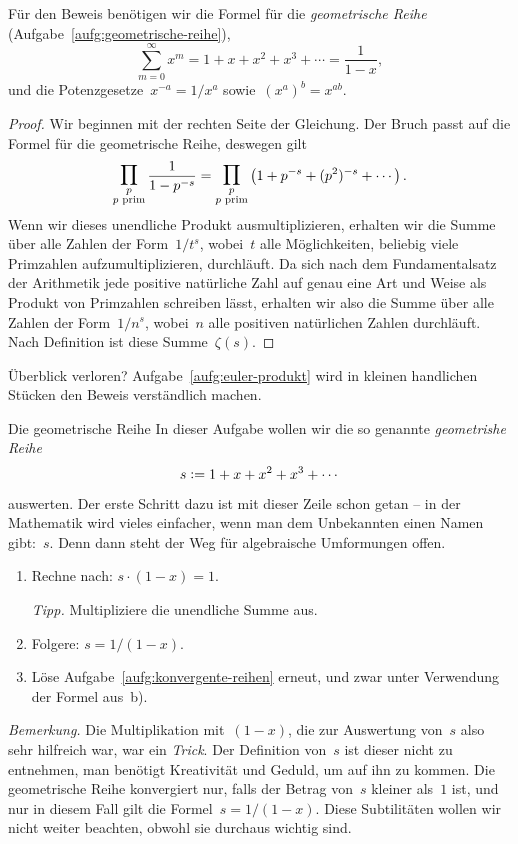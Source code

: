 \documentclass[twoside]{../zirkelblatt1415}
\theoremstyle{definition}
\theoremstyle{plain}
\theoremstyle{remark}
\newcommand{\defeq}{\vcentcolon=}
\newcommand{\prim}[1]{\text{\textnormal{$#1$ prim}}}
\newcommand{\bigprod}{\mathop{\mathlarger{\mathlarger{\prod}}}}
\begin{document}
Für den Beweis benötigen wir die Formel für die \emph{geometrische Reihe}
(Aufgabe~\ref{aufg:geometrische-reihe}),
\[ \sum_{m = 0}^\infty x^m = 1 + x + x^2 + x^3 + \cdots = \frac{1}{1 - x}, \]
und die Potenzgesetze~$x^{-a} = 1/x^a$ sowie~$(x^a)^b = x^{ab}$.

\begin{proof}Wir beginnen mit der rechten Seite der Gleichung. Der Bruch passt
auf die Formel für die geometrische Reihe, deswegen gilt
\[
  \bigprod_{\substack{p\\\prim{p}}} \frac{1}{1 - p^{-s}} =
  \bigprod_{\substack{p\\\prim{p}}} \left(1 + p^{-s} + (p^2)^{-s} + \cdots\right).
\]
Wenn wir dieses unendliche Produkt ausmultiplizieren, erhalten wir
die Summe über alle Zahlen der Form~$1/t^s$, wobei~$t$ alle Möglichkeiten,
beliebig viele Primzahlen aufzumultiplizieren, durchläuft. Da sich nach dem
Fundamentalsatz der Arithmetik jede positive natürliche Zahl auf genau eine Art
und Weise als Produkt von Primzahlen schreiben lässt, erhalten wir also die
Summe über alle Zahlen der Form~$1/n^s$, wobei~$n$ alle positiven natürlichen
Zahlen durchläuft. Nach Definition ist diese Summe~$\zeta(s)$.
\end{proof}

Überblick verloren? Aufgabe~\ref{aufg:euler-produkt} wird in kleinen handlichen
Stücken den Beweis verständlich machen.

\begin{aufgabe}{Die geometrische Reihe}\label{aufg:geometrische-reihe}
In dieser Aufgabe wollen wir die so genannte \emph{geometrishe Reihe}
\[ s \defeq 1 + x + x^2 + x^3 + \cdots \]
auswerten. Der erste Schritt dazu ist mit dieser Zeile schon getan -- in der
Mathematik wird vieles einfacher, wenn man dem Unbekannten einen Namen
gibt:~$s$. Denn dann steht der Weg für algebraische Umformungen offen.
\begin{enumerate}
\item Rechne nach: $s \cdot (1 - x) = 1$.

\emph{Tipp.} Multipliziere die unendliche Summe aus.

\item Folgere: $s = 1/(1-x)$.

\item Löse Aufgabe~\ref{aufg:konvergente-reihen} erneut, und zwar unter
Verwendung der Formel aus~b).
\end{enumerate}

\emph{Bemerkung.} Die Multiplikation mit~$(1-x)$, die zur Auswertung von~$s$
also sehr hilfreich war, war ein \emph{Trick}. Der Definition von~$s$ ist
dieser nicht zu entnehmen, man benötigt Kreativität und Geduld, um auf ihn zu
kommen. Die geometrische Reihe konvergiert nur, falls der Betrag von~$s$
kleiner als~$1$ ist, und nur in diesem Fall gilt die Formel~$s = 1/(1-x)$.
Diese Subtilitäten wollen wir nicht weiter beachten, obwohl sie durchaus
wichtig sind.
\end{aufgabe}
\end{document}
